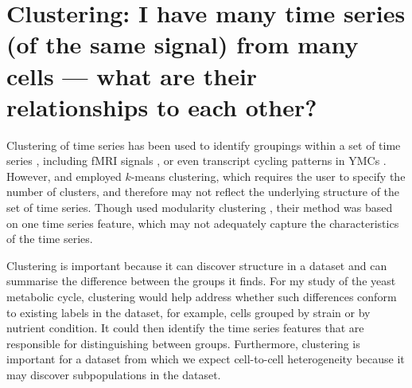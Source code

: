 


\section[Clustering]{Clustering: I have many time series (of the same signal) from many cells --- what are their relationships to each other?}
\label{sec:analysis-clustering}


Clustering of time series has been used to identify groupings within a set of time series \parencite{wangStructureBasedStatisticalFeatures2007}, including fMRI signals \parencite{shafieiDopamineSignalingModulates2019}, or even transcript cycling patterns in YMCs \parencite{tuLogicYeastMetabolic2005}.
However, \textcite{wangStructureBasedStatisticalFeatures2007} and \textcite{tuLogicYeastMetabolic2005} employed $k$-means clustering, which requires the user to specify the number of clusters, and therefore may not reflect the underlying structure of the set of time series.
Though \textcite{shafieiDopamineSignalingModulates2019} used modularity clustering \parencite{newmanModularityCommunityStructure2006}, their method was based on one time series feature, which may not adequately capture the characteristics of the time series.

Clustering is important because it can discover structure in a dataset and can summarise the difference between the groups it finds.
For my study of the yeast metabolic cycle, clustering would help address whether such differences conform to existing labels in the dataset, for example, cells grouped by strain or by nutrient condition.
It could then identify the time series features that are responsible for distinguishing between groups.
Furthermore, clustering is important for a dataset from which we expect cell-to-cell heterogeneity because it may discover subpopulations in the dataset.

